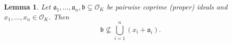 \documentclass[leqno,a4paper,12pt]{article}
\newtheorem{Lemma}[Th]{Lemma}
\theoremstyle{definition}
\newcommand{\OK}{\mathcal{O}_K}
\begin{document}
\begin{Lemma}\label{lem2_multi}
Let $\mathfrak{a}_1,\ldots,\mathfrak{a}_n,\mathfrak{b}\subsetneq\OK$ be pairwise coprime (proper) ideals and $x_1,\ldots,x_n\in\OK$. Then
\[
\mathfrak{b}\not\subseteq \bigcup_{i=1}^n(x_i+\mathfrak{a}_i).
\]
\end{Lemma}


%
\end{document}

